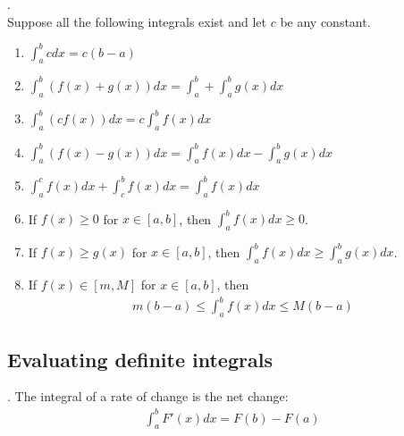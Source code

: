 \documentclass{article}
\begin{document}
\begin{theorem}
    .\\
    Suppose all the following integrals exist and let $c$ be any constant.
    \begin{enumerate}
        \item $\int_a^b cdx = c(b-a)$
        \item $\int_a^b(f(x)+g(x))dx=\int_a^b+\int_a^bg(x)dx$
        \item $\int_a^b(cf(x))dx=c\int_a^bf(x)dx$
        \item $\int_a^b(f(x)-g(x))dx=\int_a^bf(x)dx-\int_a^bg(x)dx$
        \item $\int_a^cf(x)dx+\int_c^bf(x)dx = \int_a^bf(x)dx$
        \item If $f(x)\geq 0$ for $x\in[a,b]$, then $\int_a^b f(x)dx \geq 0$.
        \item If $f(x)\geq g(x)$ for $x\in[a,b]$, then $\int_a^b f(x)dx\geq \int_a^b g(x)dx$.
        \item If $f(x)\in[m,M]$ for $x\in[a,b]$, then 
        \begin{align*}
            m(b-a)\leq \int_a^b f(x)dx \leq M(b-a)
        \end{align*}
    \end{enumerate}
\end{theorem}
\subsection{Evaluating definite integrals}
\begin{theorem}
    . The integral of a rate of change is the net change:
    \begin{align*}
        \int_a^bF'(x)dx=F(b)-F(a)
    \end{align*}
\end{theorem}
\end{document}
